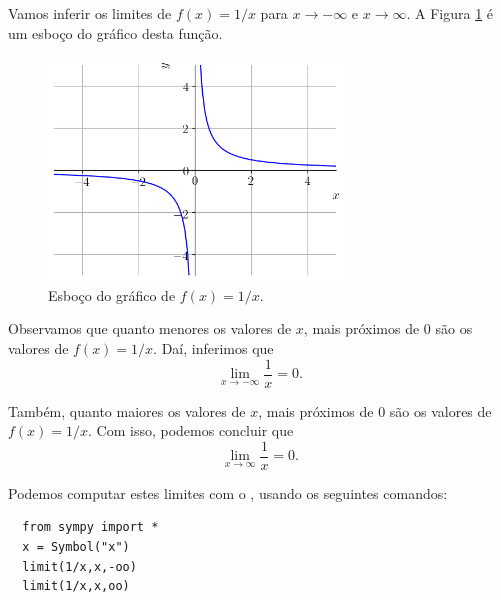 \begin{ex}
  Vamos inferir os limites de $f(x) = 1/x$ para $x\to -\infty$ e $x\to \infty$. A Figura \ref{fig:lim_xinf_1x} é um esboço do gráfico desta função.

\begin{figure}[H]
  \centering
  \includegraphics[width=0.7\textwidth]{./cap_lim/dados/fig_lim_xinf_1x/fig_lim_xinf_1x}
  \caption{Esboço do gráfico de $f(x) = 1/x$.}
  \label{fig:lim_xinf_1x}
\end{figure}

Observamos que quanto menores os valores de $x$, mais próximos de $0$ são os valores de $f(x)=1/x$. Daí, inferimos que
\begin{equation}
  \lim_{x\to -\infty} \frac{1}{x} = 0.
\end{equation}

Também, quanto maiores os valores de $x$, mais próximos de $0$ são os valores de $f(x)=1/x$. Com isso, podemos concluir que
\begin{equation}
  \lim_{x\to \infty} \frac{1}{x} = 0.
\end{equation}

\ifispython
Podemos computar estes limites com o {\sympy}, usando os seguintes comandos:
\begin{lstlisting}
  from sympy import *
  x = Symbol("x")
  limit(1/x,x,-oo)
  limit(1/x,x,oo)
\end{lstlisting}
\fi
\end{ex}


